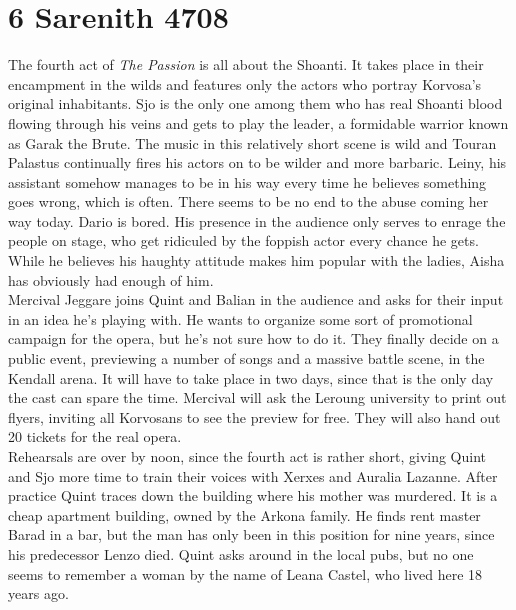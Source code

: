 \section{6 Sarenith 4708}

The fourth act of {\itshape The Passion} is all about the Shoanti. It takes place in their encampment in the wilds and features only the actors who portray Korvosa's original inhabitants. Sjo is the only one among them who has real Shoanti blood flowing through his veins and gets to play the leader, a formidable warrior known as Garak the Brute. The music in this relatively short scene is wild and Touran Palastus continually fires his actors on to be wilder and more barbaric. Leiny, his assistant somehow manages to be in his way every time he believes something goes wrong, which is often. There seems to be no end to the abuse coming her way today. Dario is bored. His presence in the audience only serves to enrage the people on stage, who get ridiculed by the foppish actor every chance he gets. While he believes his haughty attitude makes him popular with the ladies, Aisha has obviously had enough of him.\\

Mercival Jeggare joins Quint and Balian in the audience and asks for their input in an idea he's playing with. He wants to organize some sort of promotional campaign for the opera, but he's not sure how to do it. They finally decide on a public event, previewing a number of songs and a massive battle scene, in the Kendall arena. It will have to take place in two days, since that is the only day the cast can spare the time. Mercival will ask the Leroung university to print out flyers, inviting all Korvosans to see the preview for free. They will also hand out 20 tickets for the real opera.\\

Rehearsals are over by noon, since the fourth act is rather short, giving Quint and Sjo more time to train their voices with Xerxes and Auralia Lazanne. After practice Quint traces down the building where his mother was murdered. It is a cheap apartment building, owned by the Arkona family. He finds rent master Barad in a bar, but the man has only been in this position for nine years, since his predecessor Lenzo died. Quint asks around in the local pubs, but no one seems to remember a woman by the name of Leana Castel, who lived here 18 years ago.\\

